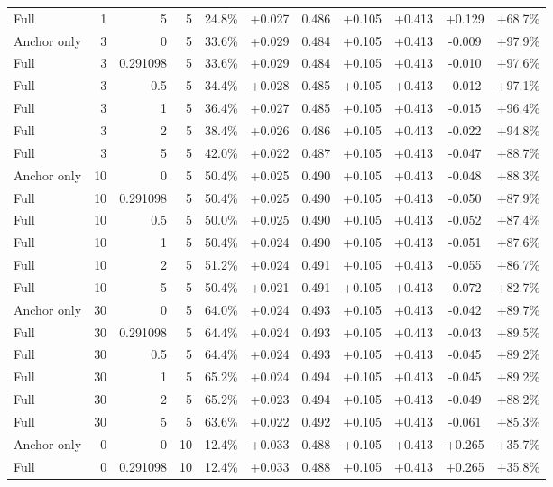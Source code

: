 \begin{table}[htbp]
\begin{tabular}{lrrrccccccc}
Full & 1 & 5 & 5 & 24.8\% & +0.027 & 0.486 & +0.105 & +0.413 & +0.129 & +68.7\% \\
Anchor only & 3 & 0 & 5 & 33.6\% & +0.029 & 0.484 & +0.105 & +0.413 & -0.009 & +97.9\% \\
Full & 3 & 0.291098 & 5 & 33.6\% & +0.029 & 0.484 & +0.105 & +0.413 & -0.010 & +97.6\% \\
Full & 3 & 0.5 & 5 & 34.4\% & +0.028 & 0.485 & +0.105 & +0.413 & -0.012 & +97.1\% \\
Full & 3 & 1 & 5 & 36.4\% & +0.027 & 0.485 & +0.105 & +0.413 & -0.015 & +96.4\% \\
Full & 3 & 2 & 5 & 38.4\% & +0.026 & 0.486 & +0.105 & +0.413 & -0.022 & +94.8\% \\
Full & 3 & 5 & 5 & 42.0\% & +0.022 & 0.487 & +0.105 & +0.413 & -0.047 & +88.7\% \\
Anchor only & 10 & 0 & 5 & 50.4\% & +0.025 & 0.490 & +0.105 & +0.413 & -0.048 & +88.3\% \\
Full & 10 & 0.291098 & 5 & 50.4\% & +0.025 & 0.490 & +0.105 & +0.413 & -0.050 & +87.9\% \\
Full & 10 & 0.5 & 5 & 50.0\% & +0.025 & 0.490 & +0.105 & +0.413 & -0.052 & +87.4\% \\
Full & 10 & 1 & 5 & 50.4\% & +0.024 & 0.490 & +0.105 & +0.413 & -0.051 & +87.6\% \\
Full & 10 & 2 & 5 & 51.2\% & +0.024 & 0.491 & +0.105 & +0.413 & -0.055 & +86.7\% \\
Full & 10 & 5 & 5 & 50.4\% & +0.021 & 0.491 & +0.105 & +0.413 & -0.072 & +82.7\% \\
Anchor only & 30 & 0 & 5 & 64.0\% & +0.024 & 0.493 & +0.105 & +0.413 & -0.042 & +89.7\% \\
Full & 30 & 0.291098 & 5 & 64.4\% & +0.024 & 0.493 & +0.105 & +0.413 & -0.043 & +89.5\% \\
Full & 30 & 0.5 & 5 & 64.4\% & +0.024 & 0.493 & +0.105 & +0.413 & -0.045 & +89.2\% \\
Full & 30 & 1 & 5 & 65.2\% & +0.024 & 0.494 & +0.105 & +0.413 & -0.045 & +89.2\% \\
Full & 30 & 2 & 5 & 65.2\% & +0.023 & 0.494 & +0.105 & +0.413 & -0.049 & +88.2\% \\
Full & 30 & 5 & 5 & 63.6\% & +0.022 & 0.492 & +0.105 & +0.413 & -0.061 & +85.3\% \\
Anchor only & 0 & 0 & 10 & 12.4\% & +0.033 & 0.488 & +0.105 & +0.413 & +0.265 & +35.7\% \\
Full & 0 & 0.291098 & 10 & 12.4\% & +0.033 & 0.488 & +0.105 & +0.413 & +0.265 & +35.8\% \\

\end{tabular}
\end{table}
